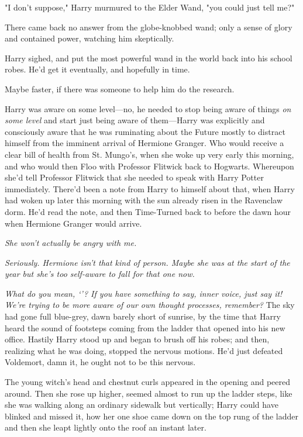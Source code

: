 "I don't suppose," Harry murmured to the Elder Wand, "you could just tell me?"

There came back no answer from the globe-knobbed wand; only a sense of glory
and contained power, watching him skeptically.

Harry sighed, and put the most powerful wand in the world back into his school
robes. He'd get it eventually, and hopefully in time.

Maybe faster, if there was someone to help him do the research.

Harry was aware on some level—no, he needed to stop being aware of things
\emph{on some level} and start just being aware of them—Harry was explicitly
and consciously aware that he was ruminating about the Future mostly to
distract himself from the imminent arrival of Hermione Granger. Who would
receive a clear bill of health from St. Mungo's, when she woke up very early
this morning, and who would then Floo with Professor Flitwick back to Hogwarts.
Whereupon she'd tell Professor Flitwick that she needed to speak with Harry
Potter immediately. There'd been a note from Harry to himself about that, when
Harry had woken up later this morning with the sun already risen in the
Ravenclaw dorm. He'd read the note, and then Time-Turned back to before the
dawn hour when Hermione Granger would arrive.

\emph{She won't actually be angry with me.}

{\el}

\emph{Seriously. Hermione isn't that kind of person. Maybe she was at the start
of the year but she's too self-aware to fall for that one now.}

{\el}

\emph{What do you mean, `{\el}'? If you have something to say, inner voice,
just say it! We're trying to be more aware of our own thought processes,
remember?}
\sbreak
The sky had gone full blue-grey, dawn barely short of sunrise, by the time that
Harry heard the sound of footsteps coming from the ladder that opened into his
new office. Hastily Harry stood up and began to brush off his robes; and then,
realizing what he was doing, stopped the nervous motions. He'd just defeated
Voldemort, damn it, he ought not to be this nervous.

The young witch's head and chestnut curls appeared in the opening and peered
around. Then she rose up higher, seemed almost to run up the ladder steps, like
she was walking along an ordinary sidewalk but vertically; Harry could have
blinked and missed it, how her one shoe came down on the top rung of the ladder
and then she leapt lightly onto the roof an instant later.

